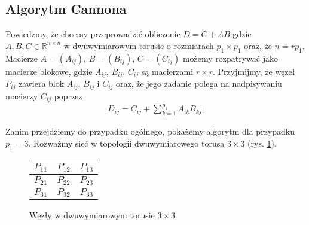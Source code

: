 
\subsection{Algorytm Cannona}
Powiedzmy, że chcemy przeprowadzić obliczenie \(D = C + AB\) gdzie \(A, B, C\in\mathbb{R}^{n\times n}\) w dwuwymiarowym torusie o rozmiarach \(p_1 \times p_1\) oraz, że \(n=rp_1\). Macierze \(A=(A_{ij})\), \(B=(B_{ij})\), \(C=(C_{ij})\) możemy rozpatrywać jako macierze blokowe, gdzie \(A_{ij}\), \(B_{ij}\), \(C_{ij}\) są macierzami \(r\times r\). Przyjmijmy, że węzeł \(P_{ij}\) zawiera blok \(A_{ij}\), \(B_{ij}\) i \(C_{ij}\) oraz, że jego zadanie polega na nadpisywaniu macierzy \(C_{ij}\) poprzez
\begin{align}\label{eq:cannon_per_node}
D_{ij}=C_{ij} + \sum_{k=1}^{p_1} A_{ik}B_{kj}.
\end{align}

Zanim przejdziemy do przypadku ogólnego, pokażemy algorytm dla przypadku \(p_1 = 3\). Rozważmy sieć w topologii dwuwymiarowego torusa \(3\times 3\) (rys. \ref{fig:cannon_torus1}).

\begin{figure}[h]
\centering
\begin{tabular}{|C{1.5cm}|C{1.5cm}|C{1.5cm}|}
\hline
\(P_{11}\) & \(P_{12}\) & \(P_{13}\) \\
\hline
\(P_{21}\) & \(P_{22}\) & \(P_{23}\) \\
\hline
\(P_{31}\) & \(P_{32}\) & \(P_{33}\) \\
\hline
\end{tabular}
\caption{Węzły w dwuwymiarowym torusie \(3\times 3\)}
\label{fig:cannon_torus1}
\end{figure}

